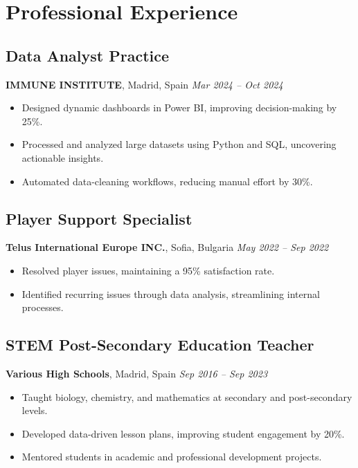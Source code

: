 \documentclass[11pt,a4paper]{article}
\begin{document}
\vspace{1em}

\section*{Professional Experience}

\subsection*{Data Analyst Practice}
\textbf{IMMUNE INSTITUTE}, Madrid, Spain \hfill \textit{Mar 2024 – Oct 2024}  
\begin{itemize}[label=\textbullet, leftmargin=0.5cm]
    \item Designed dynamic dashboards in Power BI, improving decision-making by 25\%.
    \item Processed and analyzed large datasets using Python and SQL, uncovering actionable insights.
    \item Automated data-cleaning workflows, reducing manual effort by 30\%.
\end{itemize}

\subsection*{Player Support Specialist}
\textbf{Telus International Europe INC.}, Sofia, Bulgaria \hfill \textit{May 2022 – Sep 2022}  
\begin{itemize}[label=\textbullet, leftmargin=0.5cm]
    \item Resolved player issues, maintaining a 95\% satisfaction rate.
    \item Identified recurring issues through data analysis, streamlining internal processes.
\end{itemize}

\subsection*{STEM Post-Secondary Education Teacher}
\textbf{Various High Schools}, Madrid, Spain \hfill \textit{Sep 2016 – Sep 2023}  
\begin{itemize}[label=\textbullet, leftmargin=0.5cm]
    \item Taught biology, chemistry, and mathematics at secondary and post-secondary levels.
    \item Developed data-driven lesson plans, improving student engagement by 20\%.
    \item Mentored students in academic and professional development projects.
\end{itemize}
\end{document}
